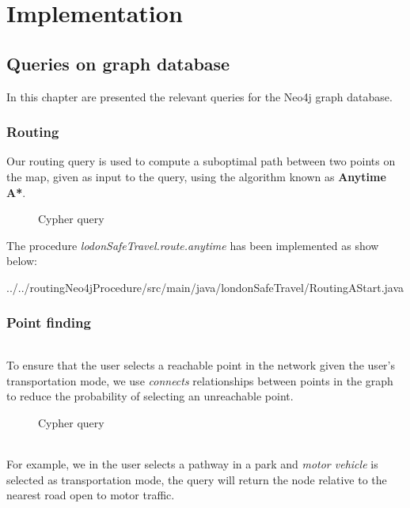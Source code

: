 \part{Implementation}

\chapter{Queries on graph database}

In this chapter are presented the relevant queries for the
Neo4j graph database.

\section{Routing}

Our routing query is used to compute a suboptimal path between two points on the map, given as input to the query, using the algorithm known as \textbf{Anytime A*}.

\begin{figure}[H]
	
	\caption{Cypher query}
\end{figure} 

The procedure \textit{lodonSafeTravel.route.anytime} has been implemented as show below:


	{../../routingNeo4jProcedure/src/main/java/londonSafeTravel/RoutingAStart.java}

\section{Point finding}

\paragraph{}
To ensure that the user selects a reachable point in the network given the user's transportation mode, we use \textit{connects} relationships between points in the graph to reduce the probability of selecting an unreachable point.

\begin{figure}[H]
	
	\caption{Cypher query}
\end{figure} 

\paragraph{}
For example, we in the user selects a pathway in a park and \textit{motor vehicle} is selected as transportation mode, the query will return the node relative to the nearest road open to motor traffic.

